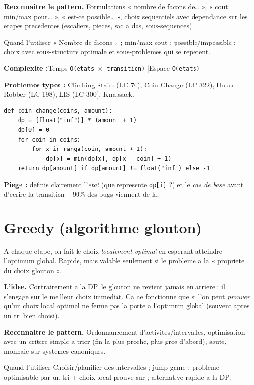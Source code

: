\documentclass[11pt,a4paper]{article}
\newcommand{\complexite}[2]{%
  \noindent\textbf{Complexite :}\quad Temps \texttt{#1} \quad|\quad Espace \texttt{#2}\par\smallskip}
\newcommand{\leetcode}[1]{\noindent\textbf{Problemes types :} #1\par\medskip}
\begin{document}
\textbf{Reconnaitre le pattern.} Formulations « nombre de facons de… », « cout
min/max pour… », « est-ce possible… », choix sequentiels avec dependance sur les
etapes precedentes (escaliers, pieces, sac a dos, sous-sequences).

\begin{infobox}{Quand l'utiliser}
« Nombre de facons » ; min/max cout ; possible/impossible ; choix avec
sous-structure optimale et sous-problemes qui se repetent.
\end{infobox}

\complexite{O(etats $\times$ transition)}{O(etats)}
\leetcode{Climbing Stairs (LC 70), Coin Change (LC 322), House Robber (LC 198), LIS (LC 300), Knapsack.}

\begin{lstlisting}
def coin_change(coins, amount):
    dp = [float("inf")] * (amount + 1)
    dp[0] = 0
    for coin in coins:
        for x in range(coin, amount + 1):
            dp[x] = min(dp[x], dp[x - coin] + 1)
    return dp[amount] if dp[amount] != float("inf") else -1
\end{lstlisting}

\textbf{Piege :} definis clairement l'\emph{etat} (que represente \texttt{dp[i]} ?)
et le \emph{cas de base} avant d'ecrire la transition -- 90\% des bugs viennent de
la.

\section{Greedy (algorithme glouton)}
A chaque etape, on fait le choix \emph{localement optimal} en esperant atteindre
l'optimum global. Rapide, mais valable seulement si le probleme a la « propriete
du choix glouton ».

\textbf{L'idee.} Contrairement a la DP, le glouton ne revient jamais en arriere :
il s'engage sur le meilleur choix immediat. Ca ne fonctionne que si l'on peut
\emph{prouver} qu'un choix local optimal ne ferme pas la porte a l'optimum global
(souvent apres un tri bien choisi).

\textbf{Reconnaitre le pattern.} Ordonnancement d'activites/intervalles,
optimisation avec un critere simple a trier (fin la plus proche, plus gros
d'abord), sauts, monnaie sur systemes canoniques.

\begin{infobox}{Quand l'utiliser}
Choisir/planifier des intervalles ; jump game ; probleme optimisable par un tri +
choix local prouve sur ; alternative rapide a la DP.
\end{infobox}
\end{document}
